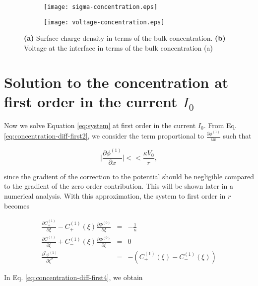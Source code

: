 \begin{figure}[htbp!]
\centering
\begin{subfigure}{.4\textwidth}
  \centering
  \texttt{[image: sigma-concentration.eps]}
  \caption{}
  \label{fig:sub1}
\end{subfigure}%
\begin{subfigure}{.4\textwidth}
  \centering
  \texttt{[image: voltage-concentration.eps]}
  \caption{}
  \label{fig:sub2}
\end{subfigure}
\caption{\textbf{(a)} Surface charge density in terms of the bulk concentration. \textbf{(b)} Voltage at the interface in terms of the bulk concentration (a)}
\label{fig:test}
\end{figure}




\section{Solution to the concentration at first order in the current $I_0$}


Now we solve Equation \ref{eq:system} at first order in the current $I_0$. From Eq. \ref{eq:concentration-diff-first2}, we consider the term proportional to $\frac{\partial \phi^{(1)}}{\partial x}$ such that

\begin{equation}
\bigg|\frac{\partial \phi^{(1)}}{\partial x}\bigg| << \frac{\kappa V_0}{r},
\label{eq:approx}
\end{equation}

since the gradient of the correction to the potential should be negligible compared to the gradient of the zero order contribution. This will be shown later in a numerical analysis. With this approximation, the system to first order in $r$ becomes

\begin{eqnarray}
\frac{\partial C^{(1)}_+}{\partial \xi}-C^{(1)}_+(\xi)\frac{\partial \Phi^{(0)}}{\partial \xi} &=& -\frac{1}{\kappa} \\
\label{eq:concentration-diff-first4}
\frac{\partial C^{(1)}_-}{\partial \xi}+C^{(1)}_-(\xi)\frac{\partial \Phi^{(0)}}{\partial \xi} &=& 0 \\
\label{eq:concentration-diff-first5}
\frac{\partial^2  \phi^{(1)}}{\partial \xi^2} &=& -(C^{(1)}_{+}(\xi)-C^{(1)}_{-}(\xi))
\label{eq:concentration-diff-first6}
\end{eqnarray}


In Eq. \ref{eq:concentration-diff-first4}, we obtain

